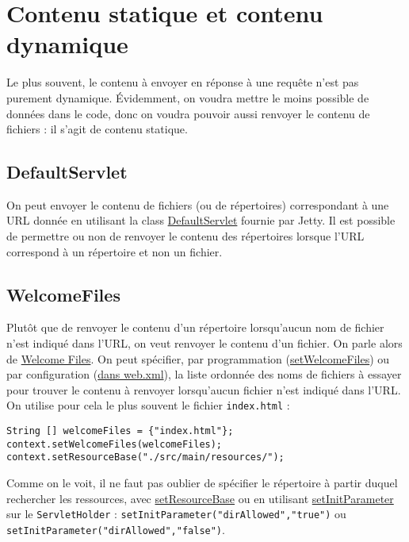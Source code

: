 \documentclass[11pt]{article}
\begin{document}
\section{Contenu statique et contenu dynamique}
\label{sec:orgeab63ea}

Le plus souvent, le contenu à envoyer en réponse à une requête n'est pas
purement dynamique. Évidemment, on voudra mettre le moins possible de données
dans le code, donc on voudra pouvoir aussi renvoyer le contenu de fichiers : il
s'agit de contenu statique.

\subsection{DefaultServlet}
\label{sec:orga4a8617}

On peut envoyer le contenu de fichiers (ou de répertoires) correspondant à une
URL donnée en utilisant la class \href{https://www.eclipse.org/jetty/javadoc/current/org/eclipse/jetty/servlet/DefaultServlet.html}{DefaultServlet} fournie par Jetty. Il est
possible de permettre ou non de renvoyer le contenu des répertoires lorsque
l'URL correspond à un répertoire et non un fichier.

\subsection{WelcomeFiles}
\label{sec:orge41fb1f}
Plutôt que de renvoyer le contenu d'un répertoire lorsqu'aucun nom de fichier
n'est indiqué dans l'URL, on veut renvoyer le contenu d'un fichier. On parle
alors de \href{https://docs.oracle.com/cd/E19798-01/821-1841/bnaer/index.html}{Welcome Files}. On peut spécifier, par programmation (\href{https://www.eclipse.org/jetty/javadoc/9.4.6.v20170531/org/eclipse/jetty/server/handler/ContextHandler.html#setWelcomeFiles-java.lang.String:A-}{setWelcomeFiles})
ou par configuration (\href{https://www.javatpoint.com/welcome-file-list}{dans web.xml}), la liste ordonnée des noms de fichiers à
essayer pour trouver le contenu à renvoyer lorsqu'aucun fichier n'est indiqué
dans l'URL. On utilise pour cela le plus souvent le fichier \texttt{index.html} :
\begin{verbatim}
String [] welcomeFiles = {"index.html"};
context.setWelcomeFiles(welcomeFiles);
context.setResourceBase("./src/main/resources/");
\end{verbatim}

Comme on le voit, il ne faut pas oublier de spécifier le répertoire à partir
duquel rechercher les ressources, avec \href{https://www.eclipse.org/jetty/javadoc/9.4.6.v20170531/org/eclipse/jetty/server/handler/ContextHandler.html#setResourceBase-java.lang.String-}{setResourceBase} ou en utilisant
\href{https://www.eclipse.org/jetty/javadoc/9.4.6.v20170531/org/eclipse/jetty/servlet/Holder.html#setInitParameter-java.lang.String-java.lang.String-}{setInitParameter} sur le \texttt{ServletHolder} : \texttt{setInitParameter("dirAllowed","true")} ou \texttt{setInitParameter("dirAllowed","false")}.
\end{document}
